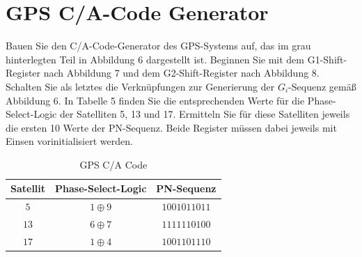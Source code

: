 \documentclass[10pt]{scrreprt}
\begin{document}
    \section{GPS C/A-Code Generator}
    Bauen Sie den C/A-Code-Generator des GPS-Systems auf, das im grau hinterlegten Teil
    in Abbildung 6 dargestellt ist. Beginnen Sie mit dem G1-Shift-Register nach Abbildung 7
    und dem G2-Shift-Register nach Abbildung 8. Schalten Sie als letztes die Verknüpfungen
    zur Generierung der $G_i$-Sequenz gemäß Abbildung 6. In Tabelle 5 finden Sie die
    entsprechenden Werte für die Phase-Select-Logic der Satelliten 5, 13 und 17. Ermitteln Sie für
    diese Satelliten jeweils die ersten 10 Werte der PN-Sequenz. Beide Register müssen dabei
    jeweils mit Einsen vorinitialisiert werden.
    \begin{table}[H]
        \centering
        \begin{tabular}{ccc}
            \toprule
            Satellit & Phase-Select-Logic & PN-Sequenz\\
            \midrule
            $5$ & $1 \oplus 9$ & $1001011011$\\
            $13$ & $6 \oplus 7$ & $1111110100$\\
            $17$ & $1 \oplus 4$ & $1001101110$\\
            \bottomrule
        \end{tabular}
        \caption{GPS C/A Code}
        \label{tab:GPS}
    \end{table}
\end{document}
